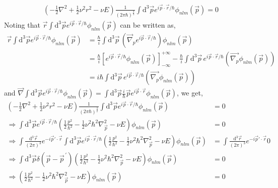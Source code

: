 \documentclass[10pt]{article}
\begin{document}
\begin{align*}
\left( -\frac{1}{2} \nabla^{2} + \frac{1}{2} \nu^{2} r^{2} - \nu E  \right) \frac{1}{(2\pi \hbar)^{\frac{3}{2}}} \int \textrm{d}^{3} \vec{p} e^{i \vec{p} \cdot \vec{r} / \hbar} \phi_{n l m}(\vec{p}) = 0
\end{align*}
Noting that $\vec{r} \int \textrm{d}^{3} \vec{p} e^{i \vec{p} \cdot \vec{r} / 
\hbar} \phi_{n l m}(\vec{p})$ can be written as,
\begin{align*}
\vec{r} \int \textrm{d}^{3} \vec{p} e^{i \vec{p} \cdot \vec{r}/ \hbar} \phi_{n 
l m}(\vec{p}) &= \frac{\hbar}{i} \int \text{d}^{3} \vec{p} \, \left( 
\vec{\nabla}_{p} e^{i \vec{p} \cdot \vec{r}/ \hbar} \right) \phi_{n l 
m}(\vec{p}) \\
	&= \frac{\hbar}{i} \left[ e^{i \vec{p} \cdot \vec{r}/ \hbar } \phi_{ n l m}(\vec{p}) \right]^{+\infty}_{-\infty} - \frac{\hbar}{i}\int \text{d}^{3} \vec{p} \,  e^{i \vec{p} \cdot \vec{r} / \hbar} \left( \vec{\nabla_{p}} \phi_{n l m}(\vec{p}) \right) \\
	&= i \hbar \int \text{d}^{3} \vec{p} \,  e^{i \vec{p} \cdot \vec{r} / \hbar} \left( \vec{\nabla_{p}} \phi_{n l m}(\vec{p}) \right)
\end{align*}
and $\vec{\nabla} \int \textrm{d}^{3} \vec{p} e^{i \vec{p} \cdot \vec{r}/ \hbar} \phi_{n l m}(\vec{p}) = \int \textrm{d}^{3} \vec{p} \frac{i}{\hbar} \vec{p} e^{i \vec{p} \cdot \vec{r}} \phi_{n l m}(\vec{p}) $, we get,
\begin{align*}
\left( -\frac{1}{2} \nabla^{2} + \frac{1}{2} \nu^{2} r^{2} - \nu E  \right) \frac{1}{(2\pi \hbar)^{\frac{3}{2}}} \int \textrm{d}^{3} \vec{p} e^{i \vec{p} \cdot \vec{r}/ \hbar} \phi_{n l m}(\vec{p}) &= 0 \\
\Rightarrow \int \textrm{d}^{3} \vec{p} e^{i \vec{p} \cdot \vec{r}/ \hbar} \left( \frac{1}{2} \frac{p^{2}}{\hbar^{2}} - \frac{1}{2} \nu^{2} \hbar^{2} \nabla^{2}_{\vec{p}} - \nu E  \right) \phi_{n l m}(\vec{p}) &= 0 \\
\Rightarrow \int \frac{\text{d}^{3} \vec{r}}{(2\pi)^{3}} e^{-i \vec{p}' \cdot \vec{r}} \int \textrm{d}^{3} \vec{p} e^{i \vec{p} \cdot \vec{r}/ \hbar} \left( \frac{1}{2} \frac{p^{2}}{\hbar^{2}} - \frac{1}{2} \nu^{2} \hbar^{2} \nabla^{2}_{\vec{p}} - \nu E  \right) \phi_{n l m}(\vec{p}) &= \int \frac{\text{d}^{3} \vec{r}}{(2\pi)^{3}} e^{-i \vec{p}' \cdot \vec{r}} 0 \\
\Rightarrow  \int \textrm{d}^{3} \vec{p} \delta(\vec{p} - \vec{p}^{\, \prime}) \left( \frac{1}{2} \frac{p^{2}}{\hbar^{2}} - \frac{1}{2} \nu^{2} \hbar^{2} \nabla^{2}_{\vec{p}} - \nu E  \right) \phi_{n l m}(\vec{p}) &= 0 \\
\Rightarrow  \left( \frac{1}{2} \frac{p^{2}}{\hbar^{2}} - \frac{1}{2} \nu^{2} \hbar^{2} \nabla^{2}_{\vec{p}} - \nu E  \right) \phi_{n l m}(\vec{p}) &= 0
\end{align*}
\end{document}
